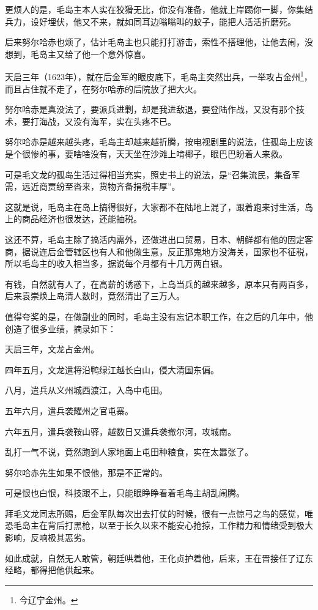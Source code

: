 \begin{multicols}{\theparacolNo}
更烦人的是，毛岛主本人实在狡猾无比，你没有准备，他就上岸踢你一脚，你集结兵力，设好埋伏，他又不来，就如同耳边嗡嗡叫的蚊子，能把人活活折磨死。

后来努尔哈赤也烦了，估计毛岛主也只能打打游击，索性不搭理他，让他去闹，没想到，毛岛主又给了他一个意外惊喜。

天启三年（1623年），就在后金军的眼皮底下，毛岛主突然出兵，一举攻占金州\footnote{今辽宁金州。}，而且占住就不走了，在努尔哈赤的后院放了把大火。

努尔哈赤是真没法了，要派兵进剿，却是我进敌退，要登陆作战，又没有那个技术，要打海战，又没有海军，实在头疼不已。

努尔哈赤是越来越头疼，毛岛主却越来越折腾，按电视剧里的说法，住孤岛上应该是个很惨的事，要啥啥没有，天天坐在沙滩上啃椰子，眼巴巴盼着人来救。

可是毛文龙的孤岛生活过得相当充实，照史书上的说法，是“召集流民，集备军需，远近商贾纷至沓来，货物齐备捐税丰厚”。

这就是说，毛岛主在岛上搞得很好，大家都不在陆地上混了，跟着跑来讨生活，岛上的商品经济也很发达，还能抽税。

这还不算，毛岛主除了搞活内需外，还做进出口贸易，日本、朝鲜都有他的固定客商，据说连后金管辖区也有人和他做生意，反正那鬼地方没海关，国家也不征税，所以毛岛主的收入相当多，据说每个月都有十几万两白银。

有钱，自然就有人了，在高薪的诱惑下，上岛当兵的越来越多，原本只有两百多，后来袁崇焕上岛清人数时，竟然清出了三万人。

值得夸奖的是，在做副业的同时，毛岛主没有忘记本职工作，在之后的几年中，他创造了很多业绩，摘录如下：

天启三年，文龙占金州。

四年五月，文龙遣将沿鸭绿江越长白山，侵大清国东偏。

八月，遣兵从义州城西渡江，入岛中屯田。

五年六月，遣兵袭耀州之官屯寨。

六年五月，遣兵袭鞍山驿，越数日又遣兵袭撤尔河，攻城南。

乱打一气不说，竟然跑到人家地面上屯田种粮食，实在太嚣张了。

努尔哈赤先生如果不恨他，那是不正常的。

可是恨也白恨，科技跟不上，只能眼睁睁看着毛岛主胡乱闹腾。

拜毛文龙同志所赐，后金军队每次出去打仗的时候，很有一点惊弓之鸟的感觉，唯恐毛岛主在背后打黑枪，以至于长久以来不能安心抢掠，工作精力和情绪受到极大影响，反响极其恶劣。

如此成就，自然无人敢管，朝廷哄着他，王化贞护着他，后来，王在晋接任了辽东经略，都得把他供起来。


\end{multicols}
